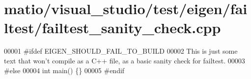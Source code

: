 \hypertarget{matio_2visual__studio_2test_2eigen_2failtest_2failtest__sanity__check_8cpp_source}{}\section{matio/visual\+\_\+studio/test/eigen/failtest/failtest\+\_\+sanity\+\_\+check.cpp}
\label{matio_2visual__studio_2test_2eigen_2failtest_2failtest__sanity__check_8cpp_source}

\begin{DoxyCode}
00001 \textcolor{preprocessor}{#ifdef EIGEN\_SHOULD\_FAIL\_TO\_BUILD}
00002 This is just some text that won\textcolor{stringliteral}{'t compile as a C++ file, as a basic sanity check for failtest.}
00003 \textcolor{stringliteral}{#else}
00004 \textcolor{stringliteral}{int main() \{\}}
00005 \textcolor{stringliteral}{#endif}
\end{DoxyCode}
